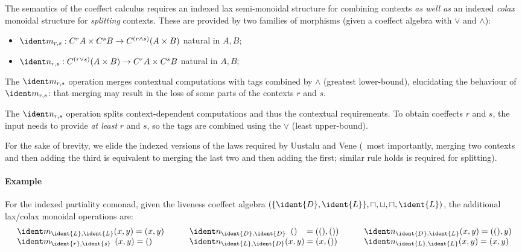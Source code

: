 The semantics of the coeffect calculus requires an indexed
lax semi-monoidal structure for combining contexts \emph{as well as} an indexed
\emph{colax} monoidal structure for \emph{splitting} contexts. These are provided
by two families of morphisms (given a coeffect algebra with $\vee$ and $\wedge$):
%
\begin{itemize}
\item $\cmerge_{r, s} : \iftor r A \times \iftor s B \rightarrow \iftor{(r \wedge s)}(A \times B)$ natural
in $A, B$;
\item $\csplit_{r, s} : \iftor{(r \vee s)}(A \times B) \rightarrow \iftor r A \times \iftor s B$ natural
in $A, B$;
\end{itemize}
%
\noindent
The $\cmerge_{r, s}$ operation merges contextual computations with
tags combined by $\wedge$ (greatest lower-bound), elucidating 
the behaviour of $\cmerge_{r, s}$: that merging may result in 
the loss of some parts of the contexts $r$ and $s$.

The $\csplit_{r, s}$ operation splits context-dependent computations
and thus the contextual requirements. To obtain coeffects $r$ and
$s$, the input needs to provide \emph{at least} $r$ and $s$, so the
tags are combined using the $\vee$ (least upper-bound).

For the sake of brevity, we elide the indexed versions of the laws required by Uustalu and Vene
(\eg~most importantly, merging two contexts and then adding the third is
equivalent to merging the last two and then adding the first; similar rule holds is required
for splitting).

\paragraph{Example}
For the indexed partiality comonad, given the liveness coeffect
algebra $(\{\ident{D}, \ident{L}\}, \sqcap, \sqcup, \sqcap, \ident{L})$,
the additional lax/colax monoidal operations are:
\begin{align*}
\begin{array}{lll}
\cmerge_{\ident{L}, \ident{L}} (x, y) = (x, y) 
  \quad\quad& \csplit_{\ident{D}, \ident{D}} \;\; () \;\;\; = ((), ())
  \quad\quad& \csplit_{\ident{D}, \ident{L}} (x, y) = ((), y) \\
\cmerge_{\ident{r}, \ident{s}} \;\,(x, y) = () 
  & \csplit_{\ident{L}, \ident{D}} (x, y) = (x, ())
  & \csplit_{\ident{L}, \ident{L}} (x, y) = (x, y)
\end{array}
\end{align*}

